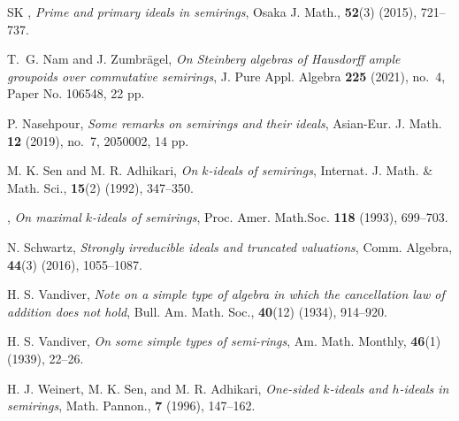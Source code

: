 \documentclass[11pt,english]{amsart}
\theoremstyle{definition}
\numberwithin{equation}{section}
\begin{document}
\begin{thebibliography}{SK}
 \bysame, \textit{Prime and primary ideals in semirings}, Osaka J. Math., \textbf{52}(3) (2015), 721--737.



 T.~G. Nam and J. Zumbr\"agel, \textit{On Steinberg algebras of Hausdorff ample groupoids over commutative semirings}, J. Pure Appl. Algebra {\bf 225} (2021), no.~4, Paper No. 106548, 22 pp.


 P. Nasehpour, \textit{Some remarks on semirings and their ideals}, Asian-Eur. J. Math. {\bf 12} (2019), no.~7, 2050002, 14 pp.
    
 M. K. Sen and M. R. Adhikari, \textit{On $k$-ideals of semirings}, Internat. J. Math. \& Math. Sci., \textbf{15}(2) (1992), 347--350.
	
 \bysame, \textit{On maximal $k$-ideals of semirings}, Proc. Amer. Math.Soc. \textbf{118} (1993), 699--703.
	
 N. Schwartz, \textit{Strongly irreducible ideals and truncated valuations}, Comm. Algebra, \textbf{44}(3) (2016), 1055--1087.  
	
 H. S. Vandiver, \textit{Note on a simple type of algebra in which the cancellation law of addition does not hold}, Bull. Am. Math. Soc., \textbf{40}(12) (1934), 914--920.
	
 H. S. Vandiver, \textit{On some simple types of semi-rings}, Am. Math. Monthly, \textbf{46}(1) (1939), 22--26.
	
 H. J. Weinert, M. K. Sen, and M. R. Adhikari, \textit{One-sided $k$-ideals and $h$-ideals in semirings}, Math. Pannon., \textbf{7} (1996), 147--162.












\end{thebibliography}
\end{document}
